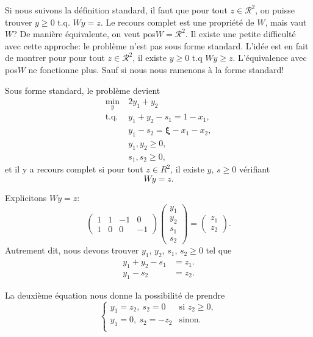 \documentclass[12pt]{book}
\def\cR {\mathcal{R}}
\def\bxi {\boldsymbol{\xi}}
\begin{document}
\begin{enumerate}
Si nous suivons la définition standard, il faut que pour tout $z \in \cR^{2}$, on puisse
trouver $y \geq 0$ t.q. $Wy = z$. Le recours complet est une propriété de $W$, mais vaut
$W$? De manière équivalente, on veut pos$W = \cR^2$.
Il existe une petite difficulté avec cette approche: le problème n'est pas sous forme standard.
L'idée est en fait de montrer pour pour tout $z \in \cR^2$, il existe
$y \geq 0$ t.q $Wy \geq z$. L'équivalence avec pos$W$ ne fonctionne
plus. Sauf si nous nous ramenons à la forme standard!

\mbox{}

Sous forme standard, le problème devient
\begin{align*}
\min_y\ & 2y_1+y_2\\
\mbox{t.q. } & y_1 + y_2 - s_1 = 1-x_1,\\
& y_1 - s_2 = \bxi - x_1-x_2,\\
& y_1, y_2 \geq 0,\\
& s_1, s_2 \geq 0,
\end{align*}
et il y a recours complet si pour tout $z \in R^2$, il existe $y$, $s
\geq 0$ vérifiant
\[
Wy = z.
\]

Explicitons $Wy = z$:
\[
\begin{pmatrix}
1 & 1 & -1 & 0 \\
1 & 0 & 0  & -1
\end{pmatrix}
\begin{pmatrix} y_1 \\ y_2 \\ s_1 \\ s_2 \end{pmatrix} =
\begin{pmatrix} z_1 \\ z_2 \end{pmatrix}.
\]
Autrement dit, nous devons trouver $y_1$, $y_2$, $s_1$, $s_2 \geq 0$
tel que
\begin{align*}
y_1 + y_2 - s_1 &= z_1. \\
y_1 - s_2 &= z_2.
\end{align*}

La deuxième équation nous donne la possibilité de prendre
\[
\begin{cases}
y_1 = z_2,\ s_2 = 0 & \mbox{si } z_2 \geq 0,\\
y_1 = 0,\ s_2 = -z_2 & \mbox{sinon}.\\
\end{cases}
\]


\end{enumerate}
\end{document}
